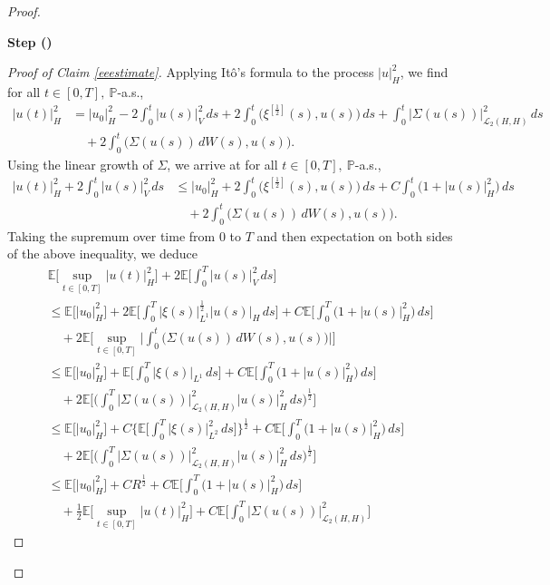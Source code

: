 \documentclass[english,a4paper,11pt]{amsart}
\theoremstyle{plain}
\theoremstyle{definition}
\theoremstyle{remark}
\numberwithin{equation}{section}
\newcounter{lil1}
\newenvironment{step}
{\begin{list} { \bf Step (\Roman{lil1})}
		{ \usecounter{lil1}
			\setlength{\leftmargin}{0.0cm}
			\setlength{\topsep}{0.2cm}
			\setlength{\itemsep}{0.0cm}
			\setlength{\parsep}{0.1cm}
			\setlength{\itemindent}{0.8cm}
			\setlength{\parskip}{0.0cm}}}
	{\end{list}}
\newcounter{lil33}
\newcounter{lil1q}
\newcommand{\EE}{ \mathbb{E} }
\renewcommand{\P}{\mathbb{P}}
\begin{document}
\begin{proof}
\begin{step}
\begin{proof}[Proof of Claim \ref{eeestimate}]
Applying It\^o's formula to the process $ | u | _{H}^2$, we find for all $t\in[0,T], \ \P$-a.s.,
\begin{align*}
	 | u(t) | _H^2& =  | u_0 | _H^2-2\int_0^t  | u(s) | _V^2\,ds +2\int_0^t \big(\xi^{[\frac{1}{2}]}(s),u(s)\big)\,ds+\int_0^t | \Sigma(u(s)) | _{\mathcal{L}_2(H,H)}^2 \,ds 
	\\& \quad + 2\int_0^t \big(\Sigma(u(s))\, dW(s), u(s)\big).
\end{align*} Using the linear growth of $\Sigma$, we arrive at for all $t\in[0,T],\ \P$-a.s.,
\begin{align*}
	 | u(t) | _H^2+2\int_0^t  | u(s) | _V^2\,ds & \leq   | u_0 | _H^2+2\int_0^t \big(\xi^{[\frac{1}{2}]}(s),u(s)\big)\,ds+C \int_0^t\big(1+ | u(s) | _{H}^2\big) \,ds 
	\\& \quad + 2\int_0^t \big(\Sigma(u(s))\, dW(s), u(s)\big).
\end{align*}Taking the supremum over time from $0$ to $T$ and then expectation on both sides of the above inequality, we deduce 
\begin{align*}
	&\EE\bigg[\sup_{t\in[0,T]}	 | u(t) | _H^2\bigg]+2\EE\bigg[\int_0^T  | u(s) | _V^2\,ds\bigg] \\& \leq  \EE\big[ | u_0 | _H^2\big]+2\EE\bigg[\int_0^T  | \xi(s) | _{L^1}^\frac{1}{2} | u(s) | _H\,ds\bigg]+C \EE\bigg[\int_0^T\big(1+ | u(s) | _{H}^2\big) \,ds\bigg] 
	\\& \quad + 2\EE\bigg[\sup_{t\in[0,T]}\bigg|\int_0^t \big(\Sigma(u(s))\, dW(s), u(s)\big)\bigg|\bigg]
	\\& \leq 
	\EE\big[ | u_0 | _H^2\big]+\EE\bigg[\int_0^T  | \xi(s) | _{L^1}\,ds\bigg]+C \EE\bigg[\int_0^T\big(1+ | u(s) | _{H}^2\big) \,ds\bigg] 
	\\& \quad + 2\EE\bigg[\bigg(\int_0^T  | \Sigma(u(s)) | _{\mathcal{L}_2(H,H)}^2 | u(s) | _H^2\,ds\bigg)^\frac{1}{2}\bigg]
	\\& \leq 
	\EE\big[ | u_0 | _H^2\big]+C\bigg\{\EE\bigg[\int_0^T  | \xi(s) | _{L^2}^2\,ds\bigg]\bigg\}^\frac{1}{2}+C \EE\bigg[\int_0^T\big(1+ | u(s) | _{H}^2\big) \,ds\bigg] 
	\\& \quad + 2\EE\bigg[\bigg(\int_0^T  | \Sigma(u(s)) | _{\mathcal{L}_2(H,H)}^2 | u(s) | _H^2\,ds\bigg)^\frac{1}{2}\bigg]
	\\& \leq 
	\EE\big[ | u_0 | _H^2\big]+CR^\frac{1}{2}+C \EE\bigg[\int_0^T\big(1+ | u(s) | _{H}^2\big) \,ds\bigg] 
	\\& \quad + \frac{1}{2}\EE\bigg[\sup_{t\in[0,T]} | u(t) | _H^2\bigg]+C\EE \bigg[\int_0^T  | \Sigma(u(s)) | _{\mathcal{L}_2(H,H)}^2\bigg]

\end{align*}
\end{proof}
\end{step}
\end{proof}
\end{document}
